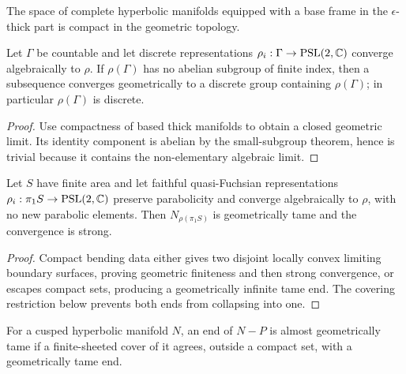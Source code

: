 \begin{corollary}
\label{thurston-ch09-based-thick-compactness}
 The space of complete hyperbolic manifolds equipped with a base frame in the $\epsilon$-thick part is compact in the geometric topology.
\end{corollary}

\begin{corollary}
\label{thurston-ch09-non-elementary-limit-discrete}
 Let $\Gamma$ be countable and let discrete representations $\rho_i:\Gamma\to\operatorname{PSL}(2,\mathbb{C})$ converge algebraically to $\rho$. If $\rho(\Gamma)$ has no abelian subgroup of finite index, then a subsequence converges geometrically to a discrete group containing $\rho(\Gamma)$; in particular $\rho(\Gamma)$ is discrete.
\end{corollary}
\begin{proof}\sketch Use compactness of based thick manifolds to obtain a closed geometric limit. Its identity component is abelian by the small-subgroup theorem, hence is trivial because it contains the non-elementary algebraic limit.\end{proof}

\begin{theorem}
\label{thurston-ch09-quasi-fuchsian-strong-limit}
 Let $S$ have finite area and let faithful quasi-Fuchsian representations $\rho_i:\pi_1S\to\operatorname{PSL}(2,\mathbb{C})$ preserve parabolicity and converge algebraically to $\rho$, with no new parabolic elements. Then $N_{\rho(\pi_1S)}$ is geometrically tame and the convergence is strong.
\end{theorem}
\begin{proof}\sketch Compact bending data either gives two disjoint locally convex limiting boundary surfaces, proving geometric finiteness and then strong convergence, or escapes compact sets, producing a geometrically infinite tame end. The covering restriction below prevents both ends from collapsing into one.\end{proof}

\begin{definition}
\label{thurston-ch09-almost-geometrically-tame}
 For a cusped hyperbolic manifold $N$, an end of $N-P$ is almost geometrically tame if a finite-sheeted cover of it agrees, outside a compact set, with a geometrically tame end.
\end{definition}

